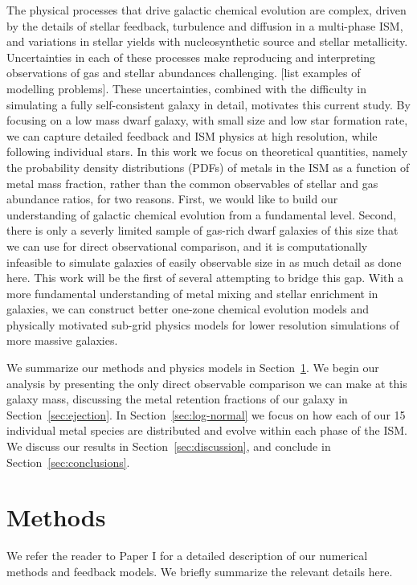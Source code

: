 \documentclass[twocolumn]{aastex61}
\begin{document}
The physical processes that drive galactic chemical evolution are complex, driven by the details of stellar feedback, turbulence and diffusion in a multi-phase ISM, and variations in stellar yields with nucleosynthetic source and stellar metallicity. Uncertainties in each of these processes make reproducing and interpreting observations of gas and stellar abundances challenging. [list examples of modelling problems]. These uncertainties, combined with the difficulty in simulating a fully self-consistent galaxy in detail, motivates this current study. By focusing on a low mass dwarf galaxy, with small size and low star formation rate, we can capture detailed feedback and ISM physics at high resolution, while following individual stars. In this work we focus on theoretical quantities, namely the probability density distributions (PDFs) of metals in the ISM as a function of metal mass fraction, rather than the common observables of stellar and gas abundance ratios, for two reasons. First, we would like to build our understanding of galactic chemical evolution from a fundamental level. Second, there is only a severly limited sample of gas-rich dwarf galaxies of this size that we can use for direct observational comparison, and it is computationally infeasible to simulate galaxies of easily observable size in as much detail as done here. This work will be the first of several attempting to bridge this gap. With a more fundamental understanding of metal mixing and stellar enrichment in galaxies, we can construct better one-zone chemical evolution models and physically motivated sub-grid physics models for lower resolution simulations of more massive galaxies.

We summarize our methods and physics models in Section~\ref{sec:methods}. We begin our analysis by presenting the only direct observable comparison we can make at this galaxy mass, discussing the metal retention fractions of our galaxy in Section~\ref{sec:ejection}. In Section~\ref{sec:log-normal} we focus on how each of our 15 individual metal species are distributed and evolve within each phase of the ISM. We discuss our results in Section~\ref{sec:discussion}, and conclude in Section~\ref{sec:conclusions}.

\section{Methods}
\label{sec:methods}
We refer the reader to Paper I for a detailed description of our numerical methods and feedback models. We briefly summarize the relevant details here.
\end{document}
